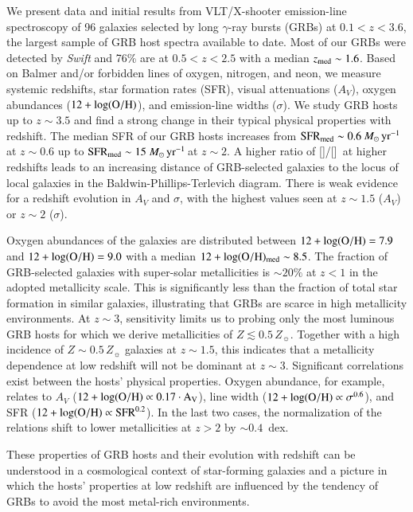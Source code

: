 \documentclass[traditabstract, longauth]{aa}
\newcommand{\oh}{12+\log(\rm{O/H})}
\newcommand{\oii}{[\ion{O}{ii}]}
\newcommand{\oiii}{[\ion{O}{iii}]}
\newcommand{\Msunyr}{$M_\odot\,\rm{yr}^{-1}$}
\begin{document}
\abstract
{We present data and initial results from VLT/X-shooter emission-line spectroscopy of {96} galaxies selected by long $\gamma$-ray bursts (GRBs) at $0.1<z<3.6$, the largest sample of GRB host spectra available to date. Most of our GRBs were detected by \textit{Swift} and 76\% are at $0.5<z<2.5$ with a median $z_{\rm{med}}\sim1.6$. Based on Balmer and/or forbidden lines of oxygen, nitrogen, and neon, we measure systemic redshifts, star formation rates (SFR), visual attenuations ($A_V$), oxygen abundances ($\oh$), and emission-line widths ($\sigma$). We study GRB hosts up to $z\sim3.5$ and find a strong change in their typical physical properties with redshift. The median SFR of our GRB hosts increases from $\rm{SFR_{med}}\sim0.6$\,\Msunyr\,at $z\sim0.6$ up to $\rm{SFR_{med}}\sim15$\,\Msunyr\,at $z\sim2$. A higher ratio of \oiii/\oii\, at higher redshifts leads to an increasing distance of GRB-selected galaxies to the locus of local galaxies in the Baldwin-Phillips-Terlevich diagram. There is weak evidence for a redshift evolution in $A_V$ and $\sigma$, with the highest values seen at $z\sim1.5$ ($A_V$) or $z\sim2$ ($\sigma$). 

{Oxygen abundances of the galaxies are distributed between $\oh=7.9$ and $\oh=9.0$ with a median $\oh_{\rm{med}}\sim 8.5$. The fraction of GRB-selected galaxies with super-solar metallicities is $\sim 20\%$ at $z<1$ in the adopted metallicity scale.}  This is significantly less than the fraction of total star formation in similar galaxies, illustrating that GRBs are scarce in high metallicity environments. At $z\sim3$, sensitivity limits us to probing only the most luminous GRB hosts for which we derive metallicities of $Z\lesssim0.5\,Z_{\sun}$. Together with a high incidence of $Z\sim0.5\,Z_{\sun}$ galaxies at $z\sim1.5$, this indicates that a metallicity dependence at low redshift will not be dominant at $z\sim3$. Significant correlations exist between the hosts' physical properties. Oxygen abundance, for example, relates to $A_V$ ($\oh \propto 0.17\cdot A_V$), line width ($\oh \propto\sigma^{0.6}$), and SFR ($\oh\propto\mathrm{SFR}^{0.2}$). In the last two cases, the normalization of the relations shift to lower metallicities at $z>2$ by $\sim0.4$~dex. 

These properties of GRB hosts and their evolution with redshift can be understood in a cosmological context of star-forming galaxies and a picture in which the hosts' properties at low redshift are influenced by the tendency of GRBs to {avoid the most metal-rich environments}.}
\end{document}
